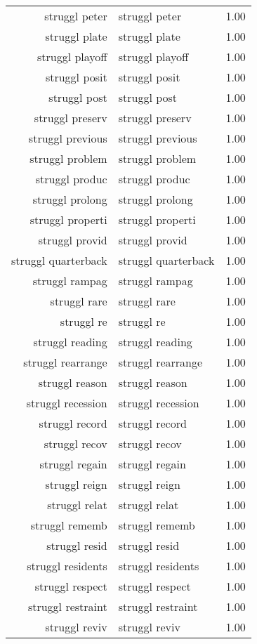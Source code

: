 \begin{table}[ht]
\begin{tabular}{rlr}
  struggl peter & struggl peter & 1.00 \\ 
  struggl plate & struggl plate & 1.00 \\ 
  struggl playoff & struggl playoff & 1.00 \\ 
  struggl posit & struggl posit & 1.00 \\ 
  struggl post & struggl post & 1.00 \\ 
  struggl preserv & struggl preserv & 1.00 \\ 
  struggl previous & struggl previous & 1.00 \\ 
  struggl problem & struggl problem & 1.00 \\ 
  struggl produc & struggl produc & 1.00 \\ 
  struggl prolong & struggl prolong & 1.00 \\ 
  struggl properti & struggl properti & 1.00 \\ 
  struggl provid & struggl provid & 1.00 \\ 
  struggl quarterback & struggl quarterback & 1.00 \\ 
  struggl rampag & struggl rampag & 1.00 \\ 
  struggl rare & struggl rare & 1.00 \\ 
  struggl re & struggl re & 1.00 \\ 
  struggl reading & struggl reading & 1.00 \\ 
  struggl rearrange & struggl rearrange & 1.00 \\ 
  struggl reason & struggl reason & 1.00 \\ 
  struggl recession & struggl recession & 1.00 \\ 
  struggl record & struggl record & 1.00 \\ 
  struggl recov & struggl recov & 1.00 \\ 
  struggl regain & struggl regain & 1.00 \\ 
  struggl reign & struggl reign & 1.00 \\ 
  struggl relat & struggl relat & 1.00 \\ 
  struggl rememb & struggl rememb & 1.00 \\ 
  struggl resid & struggl resid & 1.00 \\ 
  struggl residents & struggl residents & 1.00 \\ 
  struggl respect & struggl respect & 1.00 \\ 
  struggl restraint & struggl restraint & 1.00 \\ 
  struggl reviv & struggl reviv & 1.00 \\ 

\end{tabular}
\end{table}
